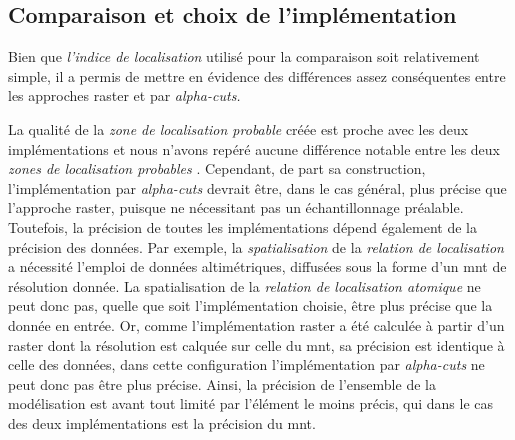 \subsection{Comparaison et choix de l'implémentation}

Bien que \emph{l'indice de localisation} utilisé pour la comparaison
soit relativement simple, il a permis de mettre en évidence des
différences assez conséquentes entre les approches raster et par
\emph{alpha-cuts.}

La qualité de la \emph{zone de localisation probable} créée est proche
avec les deux implémentations et nous n'avons repéré aucune différence
notable entre les deux \emph{zones de localisation probables}
\autocite{Bunel2019a}. Cependant, de part sa construction,
l'implémentation par \emph{alpha-cuts} devrait être, dans le cas
général, plus précise que l'approche raster, puisque ne nécessitant
pas un échantillonnage préalable. Toutefois, la précision de toutes
les implémentations dépend également de la précision des données. Par
exemple, la \emph{spatialisation} de la \emph{relation de
  localisation}  a nécessité l'emploi de
données altimétriques, diffusées sous la forme d'un \ac{mnt} de
résolution donnée. La spatialisation de la \emph{relation de
  localisation atomique}
 ne peut
donc pas, quelle que soit l'implémentation choisie, être plus précise
que la donnée en entrée. Or, comme l'implémentation raster a été
calculée à partir d'un raster dont la résolution est calquée sur celle
du \ac{mnt}, sa précision est identique à celle des données, dans
cette configuration l'implémentation par \emph{alpha-cuts} ne peut
donc pas être plus précise. Ainsi, la précision de l'ensemble de la
modélisation est avant tout limité par l'élément le moins précis, qui
dans le cas des deux implémentations est la précision du \ac{mnt}.


